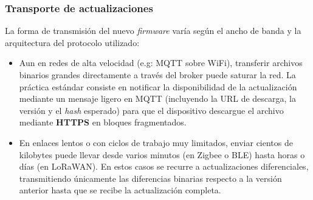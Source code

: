 \documentclass[../main.tex]{subfiles}
\begin{document}
            \subsubsection{Transporte de actualizaciones}
                La forma de transmisión del nuevo \emph{firmware} varía según el ancho de banda y la arquitectura del protocolo utilizado:

                \begin{itemize}
                    \item Aun en redes de alta velocidad (e.g: MQTT sobre WiFi), transferir archivos binarios grandes directamente a través del broker puede saturar la red. La práctica estándar consiste en notificar la disponibilidad de la actualización mediante un mensaje ligero en MQTT (incluyendo la URL de descarga, la versión y el \emph{hash} esperado) para que el dispositivo descargue el archivo mediante \textbf{HTTPS} en bloques fragmentados.
                    
                    \item En enlaces lentos o con ciclos de trabajo muy limitados, enviar cientos de kilobytes puede llevar desde varios minutos (en Zigbee o BLE) hasta horas o días (en LoRaWAN). En estos casos se recurre a actualizaciones diferenciales, transmitiendo únicamente las diferencias binarias respecto a la versión anterior hasta que se recibe la actualización completa.
                \end{itemize}
\end{document}
